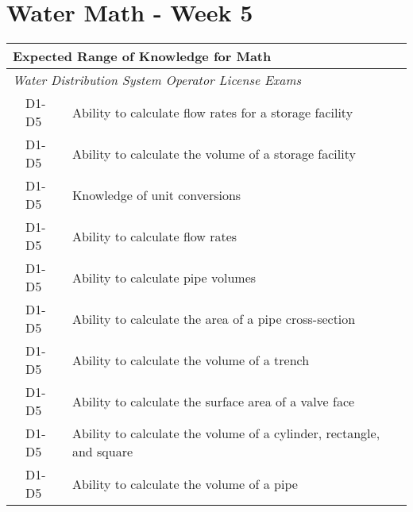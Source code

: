 \chapter{Water Math - Week 5}



\begin{table}[H]
\begin{tabular}{| m{1cm} | m{1cm} | m{12cm} |}
\hline
\multicolumn{3}{|l|}{\textbf{Expected   Range of Knowledge for Math}}                                                                      \\ \hline
\multicolumn{3}{|l|}{\textit{Water   Distribution System Operator License Exams}}                                                          \\ \hline
\multicolumn{1}{l|}{} & \multicolumn{1}{l|}{D1-D5} & Ability to calculate   flow rates for a storage facility                     \\ \cline{2-3} 
\multicolumn{1}{l|}{} & \multicolumn{1}{l|}{D1-D5} & Ability to calculate   the volume of a storage facility                      \\ \cline{2-3} 
\multicolumn{1}{l|}{} & \multicolumn{1}{l|}{D1-D5} & Knowledge of unit   conversions                                              \\ \cline{2-3} 
\multicolumn{1}{l|}{} & \multicolumn{1}{l|}{D1-D5} & Ability to calculate   flow rates                                            \\ \cline{2-3} 
\multicolumn{1}{l|}{} & \multicolumn{1}{l|}{D1-D5} & Ability to calculate   pipe volumes                                          \\ \cline{2-3} 
\multicolumn{1}{l|}{} & \multicolumn{1}{l|}{D1-D5} & Ability to calculate   the area of a pipe cross-section                      \\ \cline{2-3}
\multicolumn{1}{l|}{} & \multicolumn{1}{l|}{D1-D5} & Ability to calculate   the volume of a trench                                \\ \cline{2-3}  
\multicolumn{1}{l|}{} & \multicolumn{1}{l|}{D1-D5} & Ability to calculate   the surface area of a valve face                      \\ \cline{2-3} 
\multicolumn{1}{l|}{} & \multicolumn{1}{l|}{D1-D5} & Ability to calculate   the volume of a cylinder, rectangle, and square       \\ \cline{2-3} 
\multicolumn{1}{l|}{} & \multicolumn{1}{l|}{D1-D5} & Ability to calculate   the volume of a pipe                                  \\ \cline{2-3} 

\end{tabular}
\end{table}
